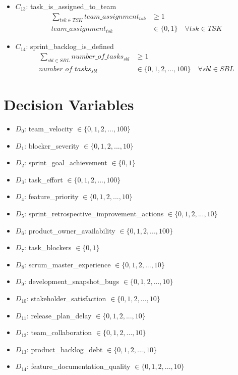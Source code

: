 \documentclass{article}
\begin{document}
\begin{itemize}
    \item $C_{13}$: task\_is\_assigned\_to\_team
        \begin{align*}
            \sum_{tsk \in TSK} team\_assignment_{tsk} &\geq 1 \\
            team\_assignment_{tsk} &\in \{0, 1\} \quad \forall tsk \in TSK
        \end{align*}
    \item $C_{14}$: sprint\_backlog\_is\_defined
        \begin{align*}
            \sum_{sbl \in SBL} number\_of\_tasks_{sbl} &\geq 1 \\
            number\_of\_tasks_{sbl} &\in \{0, 1, 2, ..., 100\} \quad \forall sbl \in SBL
        \end{align*}
\end{itemize}

\section{Decision Variables}
\begin{itemize}
    \item $D_0$: team\_velocity $\in \{0, 1, 2, ..., 100\}$
    \item $D_1$: blocker\_severity $\in \{0, 1, 2, ..., 10\}$
    \item $D_2$: sprint\_goal\_achievement $\in \{0, 1\}$
    \item $D_3$: task\_effort $\in \{0, 1, 2, ..., 100\}$
    \item $D_4$: feature\_priority $\in \{0, 1, 2, ..., 10\}$
    \item $D_5$: sprint\_retrospective\_improvement\_actions $\in \{0, 1, 2, ..., 10\}$
    \item $D_6$: product\_owner\_availability $\in \{0, 1, 2, ..., 100\}$
    \item $D_7$: task\_blockers $\in \{0, 1\}$
    \item $D_8$: scrum\_master\_experience $\in \{0, 1, 2, ..., 10\}$
    \item $D_9$: development\_snapshot\_bugs $\in \{0, 1, 2, ..., 10\}$
    \item $D_{10}$: stakeholder\_satisfaction $\in \{0, 1, 2, ..., 10\}$
    \item $D_{11}$: release\_plan\_delay $\in \{0, 1, 2, ..., 10\}$
    \item $D_{12}$: team\_collaboration $\in \{0, 1, 2, ..., 10\}$
    \item $D_{13}$: product\_backlog\_debt $\in \{0, 1, 2, ..., 10\}$
    \item $D_{14}$: feature\_documentation\_quality $\in \{0, 1, 2, ..., 10\}$
\end{itemize}
\end{document}
